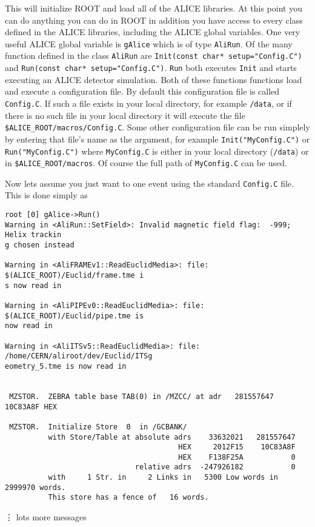 This will initialize ROOT and load all of the ALICE libraries. At this point
you can do anything you can do in ROOT in addition you have access to every
class defined in the ALICE libraries, including the ALICE global variables. One
very useful ALICE global variable is \texttt{gAlice} which is of type
\texttt{AliRun}. Of the many function defined in the class \texttt{AliRun} are
\texttt{Init(const char* setup="Config.C")} and 
\texttt{Run(const char* setup="Config.C")}. \texttt{Run} both executes
\texttt{Init} and starts executing an ALICE detector simulation. Both of these
functions functions load and execute a configuration file. By default this
configuration file is called \texttt{Config.C}. If such a file exists in your
local directory, for example \texttt{/data}, or if there is no such file in
your local directory it will execute the file
\texttt{\$ALICE\_ROOT/macros/Config.C}. Some other configuration file can be
run simplely by entering that file's name as the argument, for example
\texttt{Init("MyConfig.C")} or \texttt{Run("MyConfig.C")} where
\texttt{MyConfig.C} is either in your local directory (\texttt{/data}) or in
\texttt{\$ALICE\_ROOT/macros}. Of course the full path of \texttt{MyConfig.C}
can be used.

Now lets assume you just want to one event using the standard \texttt{Config.C}
file. This is done simply as
\scriptsize
\begin{verbatim}
root [0] gAlice->Run()
Warning in <AliRun::SetField>: Invalid magnetic field flag:  -999; Helix trackin
g chosen instead

Warning in <AliFRAMEv1::ReadEuclidMedia>: file: $(ALICE_ROOT)/Euclid/frame.tme i
s now read in

Warning in <AliPIPEv0::ReadEuclidMedia>: file: $(ALICE_ROOT)/Euclid/pipe.tme is 
now read in

Warning in <AliITSv5::ReadEuclidMedia>: file: /home/CERN/aliroot/dev/Euclid/ITSg
eometry_5.tme is now read in


 MZSTOR.  ZEBRA table base TAB(0) in /MZCC/ at adr   281557647    10C83A8F HEX

 MZSTOR.  Initialize Store  0  in /GCBANK/
          with Store/Table at absolute adrs    33632021   281557647
                                        HEX     2012F15    10C83A8F
                                        HEX    F138F25A           0
                              relative adrs  -247926182           0
          with     1 Str. in     2 Links in   5300 Low words in 2999970 words.
          This store has a fence of   16 words.
\end{verbatim}
\normalsize
\vdots
lots more messages

